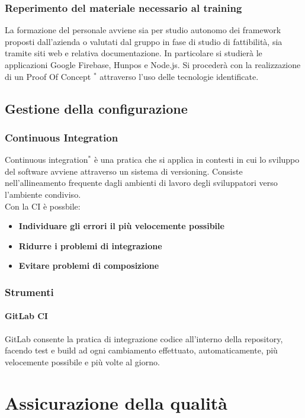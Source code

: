 \documentclass[11pt,a4paper]{article}
\begin{document}
{	\subsubsection{Reperimento del materiale necessario al training}
	La formazione del personale avviene sia per studio autonomo dei framework proposti dall’azienda o valutati dal gruppo in fase di studio di fattibilità, sia tramite siti web e relativa documentazione. In particolare si studierà le applicazioni Google Firebase, Hunpos e Node.js. Si procederà con la realizzazione di un Proof Of Concept $^*$ attraverso l’uso delle tecnologie identificate.
	\\
\subsection{Gestione della configurazione}
\subsubsection{Continuous Integration}
Continuous integration$^*$ è una pratica che si applica in contesti in cui lo sviluppo del software avviene attraverso un sistema di versioning. Consiste nell'allineamento frequente dagli ambienti di lavoro degli sviluppatori verso l'ambiente condiviso. \\
Con la CI è possbile:
\begin{itemize}
	\item \textbf{Individuare gli errori il più velocemente possibile}
	\item \textbf{Ridurre i problemi di integrazione}
	\item \textbf{Evitare problemi di composizione} 
\end{itemize}
\subsubsection{Strumenti}
\paragraph{GitLab CI\\}
GitLab consente la pratica di integrazione codice all'interno della repository, facendo test e build ad ogni cambiamento effettuato, automaticamente, più velocemente possibile e più volte al giorno.

\appendix
\section{Assicurazione della qualità}

}
\end{document}
